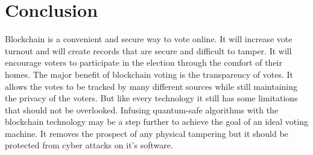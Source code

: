 \documentclass{report}
\begin{document}
\section{Conclusion}
 Blockchain is a convenient and secure way to vote online. It will increase vote turnout and will create records that are secure and difficult to tamper. It will encourage voters to participate in the election through the comfort of their homes. The major benefit of blockchain voting is the transparency of votes. It allows the votes to be tracked by many different sources while still maintaining the privacy of the voters. But like every technology it still has some limitations that should not be overlooked. Infusing quantum-safe algorithms with the blockchain technology may be a step further to achieve the goal of an ideal voting machine. It removes the prospect of any physical tampering but it should be protected from cyber attacks on it's software.






\appendix
\end{document}
